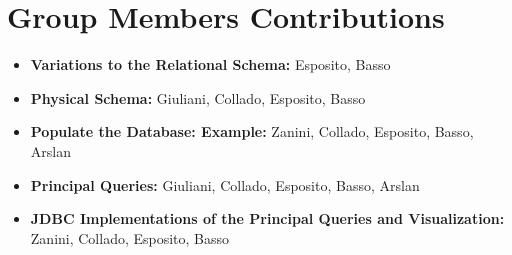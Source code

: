 \documentclass{article}
\begin{document}
\maketitle






\section{Group Members Contributions}
\begin{itemize}
	\item \textbf{Variations to the Relational Schema:} Esposito, Basso
	\item \textbf{Physical Schema:} Giuliani, Collado, Esposito, Basso
	\item \textbf{Populate the Database: Example:} Zanini, Collado, Esposito, Basso, Arslan
	\item \textbf{Principal Queries:} Giuliani, Collado, Esposito, Basso, Arslan
	\item \textbf{JDBC Implementations of the Principal Queries and Visualization:} Zanini, Collado, Esposito, Basso
\end{itemize}
\end{document}
